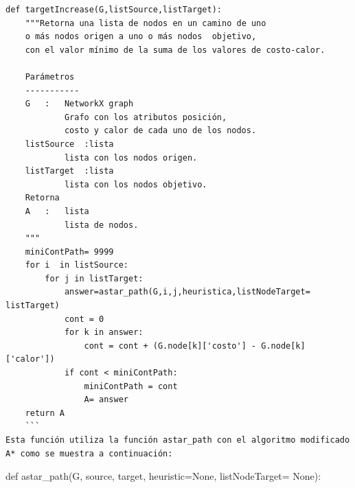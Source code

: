\documentclass[]{article}
\begin{document}
\begin{verbatim}
def targetIncrease(G,listSource,listTarget): 
    """Retorna una lista de nodos en un camino de uno 
    o más nodos origen a uno o más nodos  objetivo, 
    con el valor mínimo de la suma de los valores de costo-calor.  
    
    Parámetros 
    -----------
    G   :   NetworkX graph 
            Grafo con los atributos posición, 
            costo y calor de cada uno de los nodos.         
    listSource  :lista 
            lista con los nodos origen. 
    listTarget  :lista 
            lista con los nodos objetivo. 
    Retorna  
    A   :   lista 
            lista de nodos. 
    """ 
    miniContPath= 9999 
    for i  in listSource: 
        for j in listTarget: 
            answer=astar_path(G,i,j,heuristica,listNodeTarget= listTarget) 
            cont = 0 
            for k in answer: 
                cont = cont + (G.node[k]['costo'] - G.node[k]['calor'])  
            if cont < miniContPath: 
                miniContPath = cont  
                A= answer 
    return A 
    ```
Esta función utiliza la función astar_path con el algoritmo modificado A* como se muestra a continuación: 
\end{verbatim}

def astar\_path(G, source, target, heuristic=None, listNodeTarget=
None):
\end{document}
